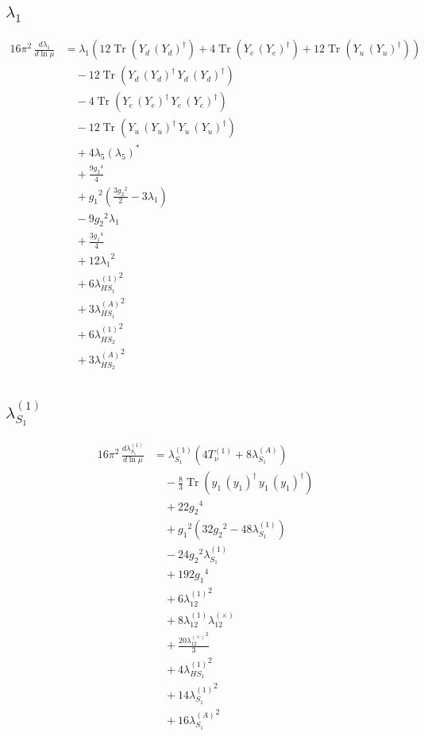 \documentclass[10pt,a4paper]{article}
\begin{document}
\subsection*{$\lambda_1$}
\begin{align*}
16\pi^2\,\frac{d \lambda_1}{d\ln\mu} &={\lambda_1} (12 \operatorname{Tr}\!\left({Y_d}\,\left({Y_d}\right)^{\dagger}\right)+4 \operatorname{Tr}\!\left({Y_e}\,\left({Y_e}\right)^{\dagger}\right)+12 \operatorname{Tr}\!\left({Y_u}\,\left({Y_u}\right)^{\dagger}\right)) \\
&\quad -12 \operatorname{Tr}\!\left({Y_d}\,\left({Y_d}\right)^{\dagger}\,{Y_d}\,\left({Y_d}\right)^{\dagger}\right) \\
&\quad -4 \operatorname{Tr}\!\left({Y_e}\,\left({Y_e}\right)^{\dagger}\,{Y_e}\,\left({Y_e}\right)^{\dagger}\right) \\
&\quad -12 \operatorname{Tr}\!\left({Y_u}\,\left({Y_u}\right)^{\dagger}\,{Y_u}\,\left({Y_u}\right)^{\dagger}\right) \\
&\quad +4 {\lambda_5} \left({\lambda_5}\right)^{*} \\
&\quad +\frac{9 {g_2}^4}{4} \\
&\quad +{g_1}^2 \left(\frac{3 {g_2}^2}{2}-3 {\lambda_1}\right) \\
&\quad -9 {g_2}^2 {\lambda_1} \\
&\quad +\frac{3 {g_1}^4}{4} \\
&\quad +12 {\lambda_1}^2 \\
&\quad +6 {\lambda_{HS_1}^{(1)}}^2 \\
&\quad +3 {\lambda_{HS_1}^{(A)}}^2 \\
&\quad +6 {\lambda_{HS_2}^{(1)}}^2 \\
&\quad +3 {\lambda_{HS_2}^{(A)}}^2 \\
\end{align*}
\subsection*{$\lambda_{S_1}^{(1)}$}
\begin{align*}
16\pi^2\,\frac{d \lambda_{S_1}^{(1)}}{d\ln\mu} &={\lambda_{S_1}^{(1)}} (4 T_{\nu}^{(1)}+8 {\lambda_{S_1}^{(A)}}) \\
&\quad -\frac{8}{3} \operatorname{Tr}\!\left({y_1}\,\left({y_1}\right)^{\dagger}\,{y_1}\,\left({y_1}\right)^{\dagger}\right) \\
&\quad +22 {g_2}^4 \\
&\quad +{g_1}^2 \left(32 {g_2}^2-48 {\lambda_{S_1}^{(1)}}\right) \\
&\quad -24 {g_2}^2 {\lambda_{S_1}^{(1)}} \\
&\quad +192 {g_1}^4 \\
&\quad +6 {\lambda_{12}^{(1)}}^2 \\
&\quad +8 {\lambda_{12}^{(1)}} {\lambda_{12}^{(\times)}} \\
&\quad +\frac{20 {\lambda_{12}^{(\times)}}^2}{3} \\
&\quad +4 {\lambda_{HS_1}^{(1)}}^2 \\
&\quad +14 {\lambda_{S_1}^{(1)}}^2 \\
&\quad +16 {\lambda_{S_1}^{(A)}}^2 \\
\end{align*}
\end{document}
